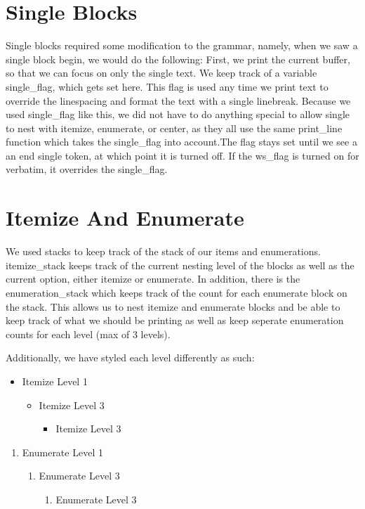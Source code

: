 \section{Single Blocks}
Single blocks required some modification to the grammar, namely, when we saw a single block begin, we would do the following: First, we print the current buffer, so that we can focus on only the single text. We keep track of a variable single_flag, which gets set here. This flag is used any time we print text to override the linespacing and format the text with a single linebreak. Because we used single_flag like this, we did not have to do anything special to allow single to nest with itemize, enumerate, or center, as they all use the same print_line function which takes the single_flag into account.The flag stays set until we see a an end single token, at which point it is turned off. If the ws_flag is turned on for verbatim, it overrides the single_flag. 

\section{Itemize And Enumerate}
We used stacks to keep track of the stack of our items and enumerations. itemize_stack
keeps track of the current nesting level of the blocks as well as the current option, 
either itemize or enumerate. In addition, there is the enumeration_stack which keeps
track of the count for each enumerate block on the stack. This allows us to nest
itemize and enumerate blocks and be able to keep track of what we should be printing
as well as keep seperate enumeration counts for each level (max of 3 levels).

Additionally, we have styled each level differently as such:

\begin{itemize}
\item Itemize Level 1
\begin{itemize}
\item Itemize Level 3
\begin{itemize}
\item Itemize Level 3
\end{itemize}
\end{itemize}
\end{itemize}
\begin{enumerate}
\item Enumerate Level 1
\begin{enumerate}
\item Enumerate Level 3
\begin{enumerate}
\item Enumerate Level 3
\end{enumerate}
\end{enumerate}
\end{enumerate}

